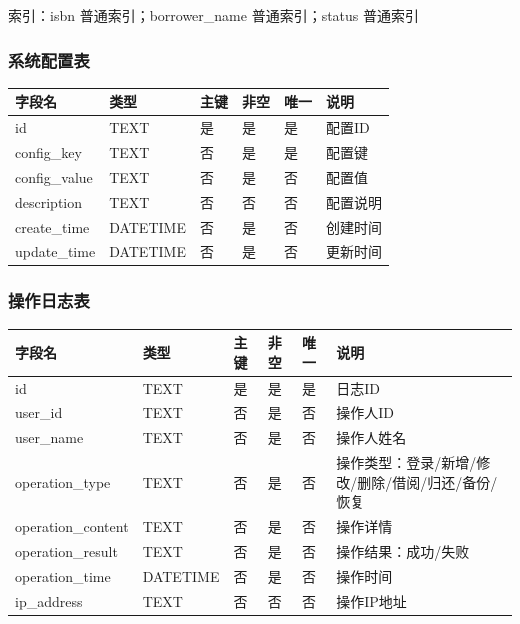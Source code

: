 \documentclass[12pt, a4paper]{article}
\begin{document}
索引：isbn 普通索引；borrower\_name 普通索引；status 普通索引

\subsubsection{系统配置表}

\begin{table}[H]
    \centering
    \begin{tabular}{|l|l|l|l|l|l|}
        \hline
        字段名 & 类型 & 主键 & 非空 & 唯一 & 说明 \\
        \hline
        id & TEXT & 是 & 是 & 是 & 配置ID \\
        \hline
        config\_key & TEXT & 否 & 是 & 是 & 配置键 \\
        \hline
        config\_value & TEXT & 否 & 是 & 否 & 配置值 \\
        \hline
        description & TEXT & 否 & 否 & 否 & 配置说明 \\
        \hline
        create\_time & DATETIME & 否 & 是 & 否 & 创建时间 \\
        \hline
        update\_time & DATETIME & 否 & 是 & 否 & 更新时间 \\
        \hline
    \end{tabular}
\end{table}

\subsubsection{操作日志表}

\begin{table}[H]
    \centering
    \begin{tabularx}{\linewidth}{|l|l|l|l|l|X|}
        \hline
        字段名 & 类型 & 主键 & 非空 & 唯一 & 说明 \\
        \hline
        id & TEXT & 是 & 是 & 是 & 日志ID \\
        \hline
        user\_id & TEXT & 否 & 是 & 否 & 操作人ID \\
        \hline
        user\_name & TEXT & 否 & 是 & 否 & 操作人姓名 \\
        \hline
        operation\_type & TEXT & 否 & 是 & 否 & 操作类型：登录/新增/修改/删除/借阅/归还/备份/恢复 \\
        \hline
        operation\_content & TEXT & 否 & 是 & 否 & 操作详情 \\
        \hline
        operation\_result & TEXT & 否 & 是 & 否 & 操作结果：成功/失败 \\
        \hline
        operation\_time & DATETIME & 否 & 是 & 否 & 操作时间 \\
        \hline
        ip\_address & TEXT & 否 & 否 & 否 & 操作IP地址 \\
        \hline
    \end{tabularx}
\end{table}
\end{document}
